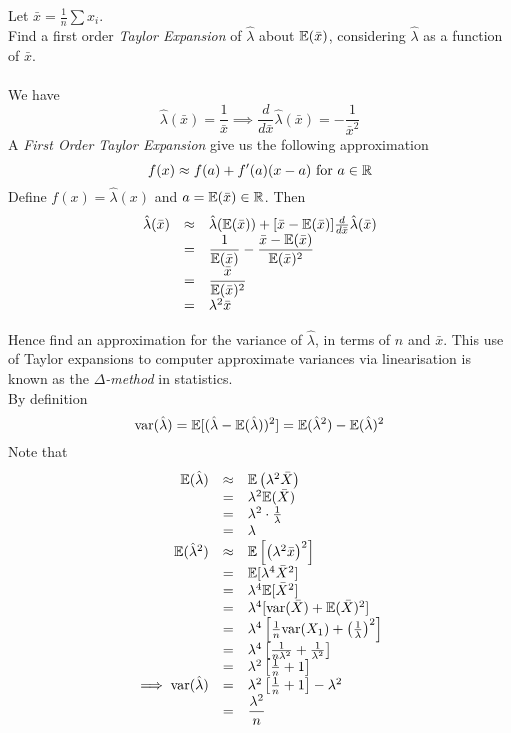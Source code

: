 \documentclass[11pt,a4paper]{article}
\begin{document}
\qpart
Let $\bar{x}=\frac{1}{n}\sum x_i$.\\
Find a first order \textit{Taylor Expansion} of $\hat\lambda$ about $\mathbb{E}(\bar{x})$, considering $\hat\lambda$ as a function of $\bar{x}$.\\
\\

\apart
We have
$$\hat\lambda(\bar{x})=\frac{1}{\bar{x}}\implies\frac{d}{d\bar{x}}\hat\lambda(\bar{x})=-\frac{1}{\bar{x}^2}$$
A \textit{First Order Taylor Expansion} give us the following approximation
$$f(x)\approx f(a)+f'(a)(x-a)\text{ for }a\in\mathbb{R}$$
Define $f(x)=\hat\lambda(x)$ and $a=\mathbb{E}(\bar{x})\in\mathbb{R}$. Then
\[\begin{array}{rcl}
\hat\lambda(\bar{x})&\approx&\hat\lambda(\mathbb{E}(\bar{x}))+[\bar{x}-\mathbb{E}(\bar{x})]\frac{d}{d\bar{x}}\hat\lambda(\bar{x})\\
&=&\dfrac1{\mathbb{E}(\bar{x})}-\dfrac{\bar{x}-\mathbb{E}(\bar{x})}{\mathbb{E}(\bar{x})^2}\\
&=&\dfrac{\bar{x}}{\mathbb{E}(\bar{x})^2}\\
&=&\lambda^2\bar{x}
\end{array}\]

\qpart
Hence find an approximation for the variance of $\hat\lambda$, in terms of $n$ and $\bar{x}$. This use of Taylor expansions to computer approximate variances via linearisation is known as the \textit{$\Delta$-method} in statistics.\\

\apart
By definition
$$\mathrm{var}(\hat\lambda)=\mathbb{E}[(\hat\lambda-\mathbb{E}(\hat\lambda))^2]=\mathbb{E}(\hat\lambda^2)-\mathbb{E}(\hat\lambda)^2$$
Note that
\[\begin{array}{rcl}
\mathbb{E}(\hat\lambda)&\approx&\mathbb{E}\left(\lambda^2\bar{X}\right)\\
&=&\lambda^2\mathbb{E}(\bar{X})\\
&=&\lambda^2\cdot\frac1\lambda\\
&=&\lambda\\
\mathbb{E}(\hat\lambda^2)&\approx&\mathbb{E}\left[\left(\lambda^2\bar{x}\right)^2\right]\\
&=&\mathbb{E}[\lambda^4\bar{X}^2]\\
&=&\lambda^4\mathbb{E}[\bar{X}^2]\\
&=&\lambda^4[\mathrm{var}(\bar{X})+\mathbb{E}(\bar{X})^2]\\
&=&\lambda^4\left[\frac1n\mathrm{var}(X_1)+\left(\frac1\lambda\right)^2\right]\\
&=&\lambda^4\left[\frac1{n\lambda^2}+\frac1{\lambda^2}\right]\\
&=&\lambda^2\left[\frac1n+1\right]\\
\implies\mathrm{var}(\hat\lambda)&=&\lambda^2\left[\frac1n+1\right]-\lambda^2\\
&=&\dfrac{\lambda^2}n
\end{array}\]
\end{document}
